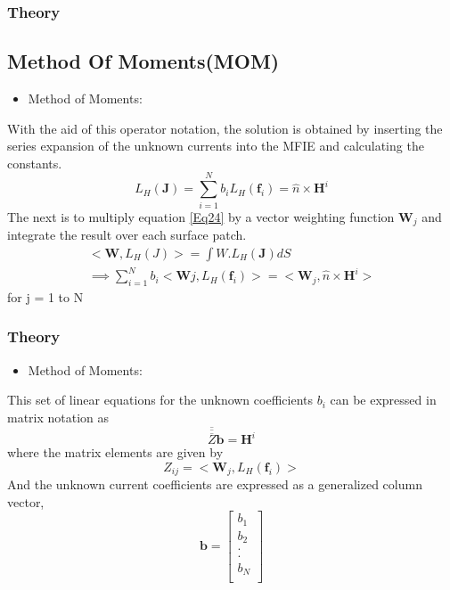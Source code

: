 \documentclass{beamer}
\begin{document}
\begin{frame}
\frametitle{Theory}
\subsection{Method Of Moments(MOM)}
\begin{itemize}
\item Method of Moments:
\end{itemize}
With the aid of this operator notation, the solution is obtained by inserting  the series expansion of the unknown currents into the MFIE and calculating the constants.
\begin{equation}
L_H(\textbf{J}) = \sum_{i=1}^N b_i L_H (\textbf{f}_i) = \hat{n}\times \textbf{H}^i
\label{Eq24}
\end{equation}
The next is to multiply equation \ref{Eq24} by a vector weighting function $\textbf{W}_j$ and integrate the result over each surface patch. 
\begin{eqnarray}
<\textbf{W}, L_H(J)> = \int W.L_H(\textbf{J})dS \\
\implies \sum_{i=1}^N b_i<\textbf{W}j,L_H(\textbf{f}_i)> = <\textbf{W}_j,\hat{n}\times\textbf{H}^i>
\end{eqnarray}
for j = 1 to N
\end{frame}
\begin{frame}
\frametitle{Theory}
\begin{itemize}
\item Method of Moments:
\end{itemize}
This set of linear equations for the unknown coefficients $b_i$ can be expressed in matrix notation as 
\begin{equation}
\overline{\overline{\overline{Z}}}\textbf{b} = \textbf{H}^i 
\end{equation}
where the matrix elements are given by
\begin{equation}
Z_{ij} = <\textbf{W}_j,L_H(\textbf{f}_i)>
\end{equation}
And the unknown current coefficients are expressed as a generalized column vector,
\begin{equation}
\textbf{b} = \begin{bmatrix}
b_1 \\
b_2 \\
. \\
. \\
b_N\\
\end{bmatrix}
\end{equation}
\end{frame}
\end{document}
